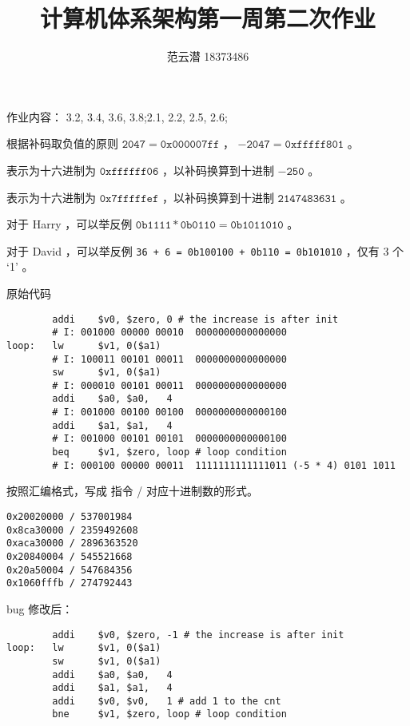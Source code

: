 \documentclass[lang=cn,11pt,a4paper,cite=authoryear]{elegantpaper}
\title{计算机体系架构\quad 第一周第二次作业}
\author{范云潜 18373486}
\institute{微电子学院 184111 班}
\date{\zhtoday}
\begin{document}
\maketitle

作业内容： 3.2, 3.4, 3.6, 3.8;2.1, 2.2, 2.5, 2.6;




根据补码取负值的原则 \(\mathtt{2047} = \mathtt{0x000007ff}\) ，
\(\mathtt{-2047} = \mathtt{0xfffff801}\) 。


表示为十六进制为 \(\mathtt{0xffffff06}\) ，以补码换算到十进制 \(\mathtt{-250}\) 。


表示为十六进制为 \(\mathtt{0x7fffffef}\) ，以补码换算到十进制 \(\mathtt{2147483631}\) 。


对于 Harry ，可以举反例 \(\mathtt{0b1111 * 0b0110} = \mathtt{0b1011010}\) 。

对于 David ，可以举反例 \lstinline{36 + 6 = 0b100100 + 0b110 = 0b101010} ，仅有 3 个 ‘1’ 。


原始代码

\begin{lstlisting}
        addi    $v0, $zero, 0 # the increase is after init
        # I: 001000 00000 00010  0000000000000000
loop:   lw      $v1, 0($a1)
        # I: 100011 00101 00011  0000000000000000
        sw      $v1, 0($a1)
        # I: 000010 00101 00011  0000000000000000
        addi    $a0, $a0,   4
        # I: 001000 00100 00100  0000000000000100
        addi    $a1, $a1,   4
        # I: 001000 00101 00101  0000000000000100
        beq     $v1, $zero, loop # loop condition
        # I: 000100 00000 00011  1111111111111011 (-5 * 4) 0101 1011
\end{lstlisting}

按照汇编格式，写成 指令 / 对应十进制数的形式。

\begin{lstlisting}
0x20020000 / 537001984
0x8ca30000 / 2359492608
0xaca30000 / 2896363520
0x20840004 / 545521668
0x20a50004 / 547684356
0x1060fffb / 274792443
\end{lstlisting}    

bug 修改后：

\begin{lstlisting}
        addi    $v0, $zero, -1 # the increase is after init
loop:   lw      $v1, 0($a1)
        sw      $v1, 0($a1)
        addi    $a0, $a0,   4
        addi    $a1, $a1,   4
        addi    $v0, $v0,   1 # add 1 to the cnt 
        bne     $v1, $zero, loop # loop condition

\end{lstlisting}
\end{document}
